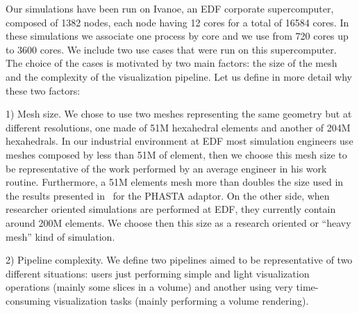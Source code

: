 Our simulations have been run on Ivanoe, an EDF corporate supercomputer,
composed of 1382 nodes, each node having 12 cores for a total of 16584 cores. In
these simulations we associate one process by core and we use from 720 cores up
to 3600 cores. We include two use cases that were run on this supercomputer. The
choice of the cases is motivated by two main factors: the size of the mesh and
the complexity of the visualization pipeline. Let us define in more detail why
these two factors:

1) Mesh size. We chose to use two meshes representing the same geometry but at
different resolutions, one made of 51M hexahedral elements and another of 204M
hexahedrals. In our industrial environment at EDF most simulation engineers use
meshes composed by less than 51M of element, then we choose this mesh size to be
representative of the work performed by an average engineer in his work routine.
Furthermore, a 51M elements mesh more than doubles the size used in the results
presented in~\cite{6092322} for the PHASTA adaptor. On the other side, when researcher
oriented simulations are performed at EDF, they currently contain around 200M
elements. We choose then this size as a research oriented or ``heavy mesh'' kind
of simulation.

2) Pipeline complexity. We define two pipelines aimed to be representative of two
different situations: users just performing simple and light visualization
operations (mainly some slices in a volume) and another using very
time-consuming visualization tasks (mainly performing a volume rendering).

